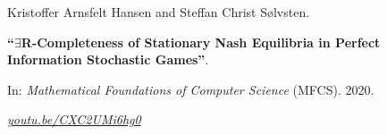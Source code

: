 Kristoffer Arnsfelt Hansen and Steffan Christ Sølvsten.

{\bf ``$\exists$R-Completeness of Stationary Nash Equilibria in Perfect
  Information Stochastic Games''}.

In: \emph{Mathematical Foundations of Computer Science} (MFCS).
2020.

\medskip

\qquad
\href{https://youtu.be/CXC2UMi6hg0}{\emph{youtu.be/CXC2UMi6hg0}}

\label{cite:2020.mfcs}